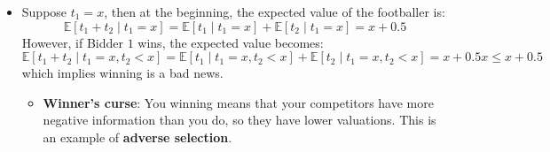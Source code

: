 \documentclass[notitlepage]{article}
\begin{document}
\begin{itemize}
\begin{itemize}
        \item From the perspective of Bidder 1, suppose Bidder 2 bids \(a_2 = t_2\). Since \(a_2 = t_2 \le 1\), Bidder 1 only needs to consider \(a_1 \in [0,1]\) to win. Then, the probability of winning is:
        \[
        \mathbb{P}(a_1 > a_2) = \mathbb{P}(t_2 < a_1)
        \]
        Since \(t_2 \sim \text{Uniform}(0,1)\) and \(a_1 \in [0,1]\), we have \(\mathbb{P}(t_2 < a_1) = a_1\).
        \item The expected payoff is then:
        \begin{align*}
            U_1 &= \mathbb{P}(t_2 < a_1) \cdot \mathbb{E}[t_1 + t_2 - a_1 \mid t_2 < a_1] \\
            &= \mathbb{P}(t_2 < a_1) \cdot (\mathbb{E}[t_1 \mid t_2 < a_1] + \mathbb{E}[t_2 \mid t_2 < a_1] - \mathbb{E}[a_1 \mid t_2 < a_1]) \\
            &= a_1 \cdot (t_1 + \frac{a_1}{2} - a_1) \\
            &= a_1t_1 - \frac{a_1^2}{2}
        \end{align*}
        \item Taking first order condition:
        \begin{align*}
            \frac{\partial U_1}{\partial a_1} = t_1 - a_1 &= 0 \\
            a_1^* &= t_1
        \end{align*}
        \item By symmetry and intersection, a BNE is therefore \((a_1^*, a_2^*) = (t_1, t_2)\).
        \item An alternative graphical approach to get the expected utility:
        \begin{figure}[h]
        \centering
        \resizebox{0.35\textwidth}{!}{
        
        }
        \end{figure}
        
        Hence,
        \[
        U_1 = \int_0^{a_1}t_1+t_2-a_1dt_2 = a_1t_1 - \frac{a_1^2}{2}
        \]
    \end{itemize}
    \item Suppose \(t_1 = x\), then at the beginning, the expected value of the footballer is:
    \[
    \mathbb{E}[t_1+t_2\mid t_1=x] = \mathbb{E}[t_1 \mid t_1=x] + \mathbb{E}[t_2\mid t_1=x] = x + 0.5
    \]
    However, if Bidder \(1\) wins, the expected value becomes:
    \[
    \mathbb{E}[t_1+t_2\mid t_1=x, t_2 < x] = \mathbb{E}[t_1 \mid t_1=x, t_2 < x] + \mathbb{E}[t_2\mid t_1=x, t_2 < x] = x + 0.5x \le x + 0.5
    \]
    which implies winning is a bad news.
    \begin{itemize}
        \item \textbf{Winner's curse}: You winning means that your competitors have more negative information than you do, so they have lower valuations. This is an example of \textbf{adverse selection}.
    \end{itemize}
\end{itemize}
\end{document}
